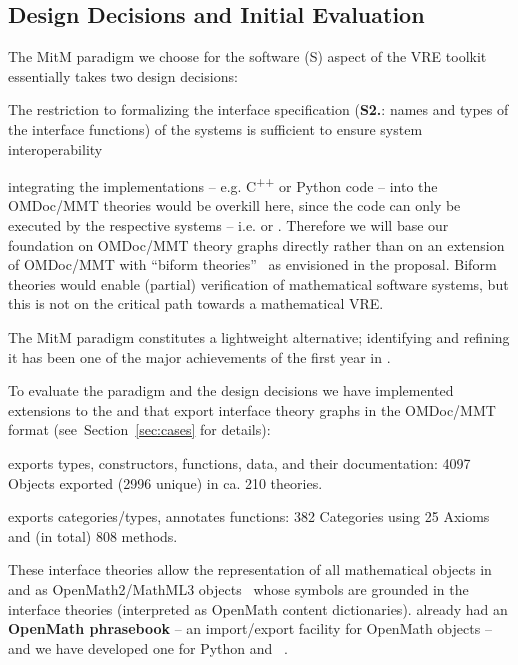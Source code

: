 \subsection{Design Decisions and Initial Evaluation}
The MitM paradigm we choose for the software (S) aspect of the \pn VRE toolkit essentially
takes two design decisions: 
\begin{compactenum}[\bf D1.]
\item The restriction to formalizing the interface specification (\textbf{S2.}: names and
  types of the interface functions) of the systems is sufficient to ensure system
  interoperability 
\item integrating the implementations -- e.g. C\textsuperscript{++} or Python code -- into
  the OMDoc/MMT theories would be overkill here, since the code can only be executed by
  the respective systems -- i.e. \GAP or \SageMath. Therefore we will base our foundation
  on OMDoc/MMT theory graphs directly rather than on an extension of OMDoc/MMT with
  ``biform theories''~\cite{KohManRab:aumftg13,Farmer:btc07} as envisioned in the
  proposal. Biform theories would enable (partial) verification of mathematical software
  systems, but this is not on the critical path towards a mathematical VRE.
\end{compactenum}
The MitM paradigm constitutes a lightweight alternative; identifying and refining it has
been one of the major achievements of the first year in .

To evaluate the paradigm and the design decisions we have implemented extensions to the
\GAP and \SageMath that export interface theory graphs in the OMDoc/MMT format
(see~Section~\ref{sec:cases} for details):
\begin{compactitem}
\item \GAP exports types, constructors, functions, data, and their documentation: 4097
  Objects exported (2996 unique) in ca. 210 theories.
\item \SageMath exports categories/types, annotates functions: 382 Categories using 25
  Axioms and (in total) 808 methods.
\end{compactitem}
These interface theories allow the representation of all mathematical objects in \GAP and
\SageMath as OpenMath2/MathML3 objects~\cite{BusCapCar:2oms03,CarlisleEd:MathML3} whose
symbols are grounded in the interface theories (interpreted as OpenMath content
dictionaries). \GAP already had an \textbf{OpenMath phrasebook} -- an import/export
facility for OpenMath objects -- and we have developed one for Python and
\SageMath~\cite{py-openmath:on}.

